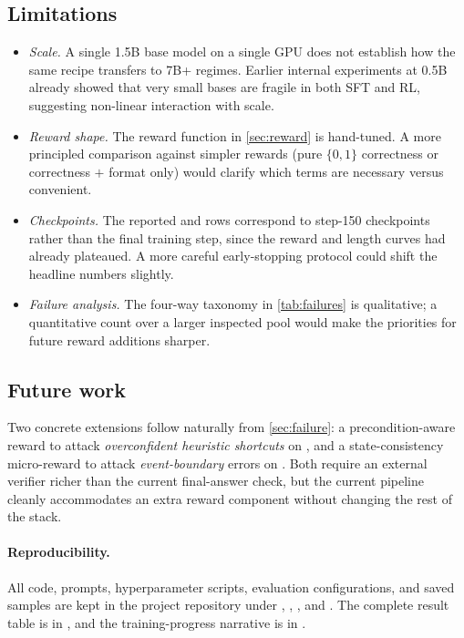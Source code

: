 \subsection{Limitations}
\begin{itemize}
  \item \emph{Scale.} A single 1.5B base model on a single GPU does not
    establish how the same recipe transfers to 7B+ regimes. Earlier
    internal experiments at 0.5B already showed that very small bases are
    fragile in both SFT and RL, suggesting non-linear interaction with
    scale.
  \item \emph{Reward shape.} The reward function in \cref{sec:reward} is
    hand-tuned. A more principled comparison against simpler rewards
    (\eg pure $\{0,1\}$ correctness or correctness $+$ format only)
    would clarify which terms are necessary versus convenient.
  \item \emph{Checkpoints.} The reported  and 
    rows correspond to step-150 checkpoints rather than the final
    training step, since the reward and length curves had already
    plateaued. A more careful early-stopping protocol could shift the
    headline numbers slightly.
  \item \emph{Failure analysis.} The four-way taxonomy in
    \cref{tab:failures} is qualitative; a quantitative count over a
    larger inspected pool would make the priorities for future reward
    additions sharper.
\end{itemize}

\subsection{Future work}
Two concrete extensions follow naturally from
\cref{sec:failure}: a precondition-aware reward to attack
\emph{overconfident heuristic shortcuts} on , and a
state-consistency micro-reward to attack \emph{event-boundary} errors on
. Both require an external verifier richer than the current
final-answer check, but the current pipeline cleanly accommodates an
extra reward component without changing the rest of the stack.

\paragraph{Reproducibility.}
All code, prompts, hyperparameter scripts, evaluation configurations, and
saved samples are kept in the project repository under
, , , and
. The complete result table is in
, and the
training-progress narrative is in .

